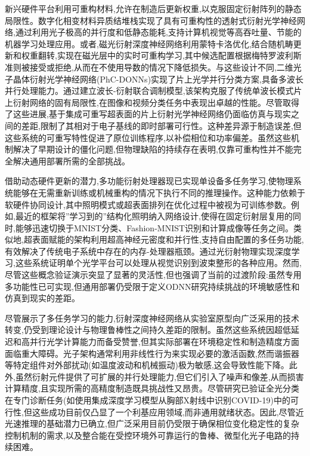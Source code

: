 新兴硬件平台利用可重构材料,允许在制造后更新权重,以克服固定衍射阵列的静态局限性。数字化相变材料异质结堆栈实现了具有可重构性的透射式衍射光学神经网络,通过利用光子极高的并行度和低静态能耗,支持计算机视觉等高吞吐量、节能的机器学习处理应用。或者,磁光衍射深度神经网络利用蒙特卡洛优化,结合随机畴更新和权重翻转,实现在磁光层中的实时可重构学习,其中候选配置根据梅特罗波利斯准则被接受或拒绝,从而在不使用导数的情况下降低损失。与这些设计不同,二维光子晶体衍射光学神经网络(PhC-DONNs)实现了片上光学并行分类方案,具备多波长并行处理能力。通过建立波长-衍射联合调制模型,该架构克服了传统单波长模式片上衍射网络的固有局限性,在图像和视频分类任务中表现出卓越的性能。尽管取得了这些进展,基于集成可重写超表面的片上衍射光学神经网络仍面临仿真与现实之间的差距,限制了其相对于电子基线的即时部署可行性。这种差异源于制造误差,但这些系统的可重写特性促进了原位训练程序,以补偿相位和功率偏差。虽然这些机制解决了早期设计的僵化问题,但物理缺陷的持续存在表明,仅靠可重构性并不能完全解决通用部署所需的全部挑战。\citep{doi_10_1002_adpr_202400201_566e9e2f} \citep{doi_10_1051_jeos_2026026_1bd8ff13} \citep{doi_10_1038_s41598_025_19638_8_1b2db1c9} \citep{doi_10_1515_nanoph_2025_0168_86a0f7aa}

借助动态硬件更新的潜力,多功能衍射处理器现已实现单设备多任务学习,使物理系统能够在无需重新训练或机械重构的情况下执行不同的推理操作。这种能力依赖于软硬件协同设计,其中照明模式或超表面排列在优化过程中被视为可训练参数。例如,最近的框架将''学习到的''结构化照明纳入网络设计,使得在固定衍射层复用的同时,能够迅速切换于MNIST分类、Fashion-MNIST识别和计算成像等任务之间。类似地,超表面赋能的架构利用超高神经元密度和并行性,支持自由配置的多任务功能,有效解决了传统电子系统中存在的内存-处理器瓶颈。通过光衍射物理实现深度学习,这些系统证明单个光学平台可以处理从视觉识别到波束整形的各种应用。然而,尽管这些概念验证演示突显了显著的灵活性,但也强调了当前的过渡阶段:虽然专用多功能性已可实现,但通用部署仍受限于定义ODNN研究持续挑战的环境敏感性和仿真到现实的差距。\citep{doi_10_1364_ol_591818_8738c4b1} \citep{doi_10_1364_prj_576203_ae347fba}

尽管展示了多任务学习的能力,衍射深度神经网络从实验室原型向广泛采用的技术转变,仍受到理论设计与物理鲁棒性之间持久差距的限制。虽然这些系统因超低延迟和高并行光学计算能力而备受赞誉,但其实际部署在环境稳定性和制造精度方面面临重大障碍。光子架构通常利用非线性行为来实现必要的激活函数,然而谐振器等特定组件对外部扰动(如温度波动和机械振动)极为敏感,这会导致性能下降。此外,虽然衍射元件提供了可扩展的并行处理能力,但它们引入了噪声和像差,从而损害计算精度,且实现所需的高精度制造既具挑战性又昂贵。尽管研究已验证全光分类在专门诊断任务(如使用集成深度学习模型从胸部X射线中识别COVID-19)中的可行性,但这些成功目前仅凸显了一个利基应用领域,而非通用就绪状态。因此,尽管近光速推理的基础潜力已确立,但广泛采用目前仍受限于确保相位变化稳定性的复杂控制机制的需求,以及整合能在受控环境外可靠运行的鲁棒、微型化光子电路的持续困难。\citep{doi_10_3390_nano14080697_c372a140} \citep{doi_10_3390_app122010535_b538921c} \citep{doi_10_1364_josab_497148_b087424b}

